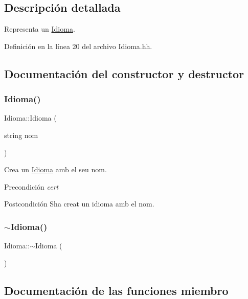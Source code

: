 \subsection{Descripción detallada}
Representa un \hyperlink{class_idioma}{Idioma}. 

Definición en la línea 20 del archivo Idioma.\+hh.



\subsection{Documentación del constructor y destructor}
\mbox{\label{class_idioma_acb367feda82c466b5c61378636b901b6}} 
\subsubsection{\texorpdfstring{Idioma()}{Idioma()}}
{\footnotesize\ttfamily Idioma\+::\+Idioma (\begin{DoxyParamCaption}\item[{string}]{nom }\end{DoxyParamCaption})}



Crea un \hyperlink{class_idioma}{Idioma} amb el seu nom. 

\begin{DoxyPrecond}{Precondición}
{\itshape cert} 
\end{DoxyPrecond}
\begin{DoxyPostcond}{Postcondición}
S\textquotesingle{}ha creat un idioma amb el nom. 
\end{DoxyPostcond}
\mbox{\label{class_idioma_a80c90f8c9a7f824d7d7d171b9face201}} 
\subsubsection{\texorpdfstring{$\sim$\+Idioma()}{~Idioma()}}
{\footnotesize\ttfamily Idioma\+::$\sim$\+Idioma (\begin{DoxyParamCaption}{ }\end{DoxyParamCaption})}



\subsection{Documentación de las funciones miembro}
\mbox{\label{class_idioma_afcdc214d9490b61d54e35da85f2354a4}} 

